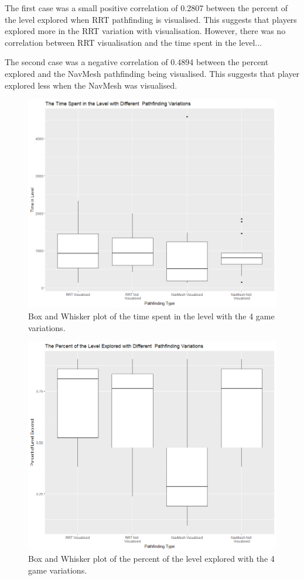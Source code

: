 \documentclass[journal]{IEEEtran}
\begin{document}
	The first case was a small positive correlation of 0.2807 between the percent of the level explored when  RRT pathfinding is visualised. This suggests that players explored more in the RRT variation with visualisation. 
	However, there was no correlation between RRT visualisation and the time spent in the level...
	
	The second case was a negative correlation of 0.4894 between the percent explored and the NavMesh pathfinding being visualised. This suggests that player explored less when the NavMesh was visualised.
	
	
	
	\begin{figure}[h]
		\includegraphics[width=1.0\linewidth]{GraphTime.png}
		\caption{Box and Whisker plot of the time spent in the level with the 4 game variations.}
		\label{graph:Time}
	\end{figure}  
	
	\begin{figure}[h]
		\includegraphics[width=1.0\linewidth]{GraphPercent.png}
		\caption{Box and Whisker plot of the percent of the level explored with the 4 game variations.}
		\label{graph:Percent}
	\end{figure}
	
\end{document}

